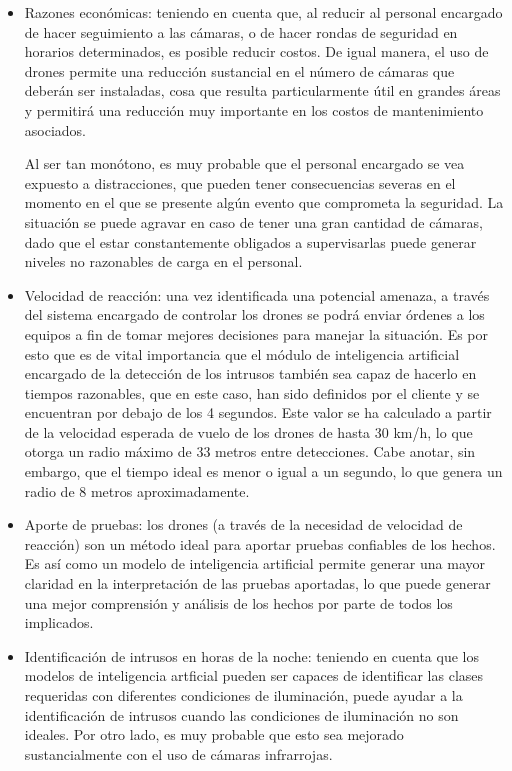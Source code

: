 \begin{itemize}
	\item Razones económicas: teniendo en cuenta que, al reducir al personal encargado de hacer seguimiento a las cámaras, o de hacer rondas de seguridad en horarios determinados, es posible reducir costos. De igual manera, el uso de drones permite una reducción sustancial en el número de cámaras que deberán ser instaladas, cosa que resulta particularmente útil en grandes áreas y permitirá una reducción muy importante en los costos de mantenimiento asociados. 
	
Al ser tan monótono, es muy probable que el personal encargado se vea expuesto a distracciones, que pueden tener consecuencias severas en el momento en el que se presente algún evento que comprometa la seguridad. La situación se puede agravar en caso de tener una gran cantidad de cámaras, dado que el estar constantemente obligados a supervisarlas puede generar niveles no razonables de carga en el personal.

	\item Velocidad de reacción: una vez identificada una potencial amenaza, a través del sistema encargado de controlar los drones se podrá enviar órdenes a los equipos a fin de tomar mejores decisiones para manejar la situación. Es por esto que es de vital importancia que el módulo de inteligencia artificial encargado de la detección de los intrusos también sea capaz de hacerlo en tiempos razonables, que en este caso, han sido definidos por el cliente y se encuentran por debajo de los 4 segundos. Este valor se ha calculado a partir de la velocidad esperada de vuelo de los drones de hasta 30 km/h, lo que otorga un radio máximo de 33 metros entre detecciones.  Cabe anotar, sin embargo, que el tiempo ideal es menor o igual a un segundo, lo que genera un radio de 8 metros aproximadamente. 
	
	\item Aporte de pruebas: los drones (a través de la necesidad de velocidad de reacción) son un método ideal para aportar pruebas confiables de los hechos. Es así como un modelo de inteligencia artificial permite generar una mayor claridad en la interpretación de las pruebas aportadas, lo que puede generar una mejor comprensión y análisis de los hechos por parte de todos los implicados.
	
	\item Identificación de intrusos en horas de la noche: teniendo en cuenta que los modelos de inteligencia artficial pueden ser capaces de identificar las clases requeridas con diferentes condiciones de iluminación, puede ayudar a la identificación de intrusos cuando las condiciones de iluminación no son ideales. Por otro lado, es muy probable que esto sea mejorado sustancialmente con el uso de cámaras infrarrojas. 

\end{itemize}

